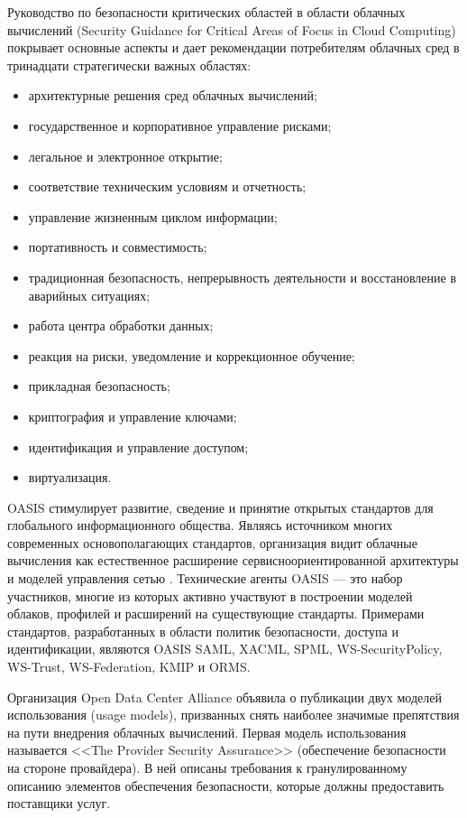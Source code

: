 Руководство по безопасности критических областей в области облачных вычислений (Security Guidance for Critical Areas of Focus in Cloud Computing) покрывает основные аспекты и дает рекомендации потребителям облачных сред в тринадцати стратегически важных областях:
\begin{itemize}
  \item архитектурные решения сред облачных вычислений;
  \item государственное и корпоративное управление рисками;
  \item легальное и электронное открытие;
  \item соответствие техническим условиям и отчетность;
  \item управление жизненным циклом информации;
  \item портативность и совместимость;
  \item традиционная безопасность, непрерывность деятельности и восстановление в аварийных ситуациях;
  \item работа центра обработки данных;
  \item реакция на риски, уведомление и коррекционное обучение;
  \item прикладная безопасность;
  \item криптография и управление ключами;
  \item идентификация и управление доступом;
  \item виртуализация.
\end{itemize}

OASIS стимулирует развитие, сведение и принятие открытых стандартов для глобального информационного общества. Являясь источником многих современных основополагающих стандартов, организация видит облачные вычисления как естественное расширение сервисноориентированной архитектуры и моделей управления сетью \cite{psta}.
Технические агенты OASIS –– это набор участников, многие из которых активно участвуют в построении моделей облаков, профилей и расширений на существующие стандарты.
Примерами стандартов, разработанных в области политик безопасности, доступа и идентификации, являются OASIS SAML, XACML, SPML, WS-SecurityPolicy, WS-Trust, WS-Federation, KMIP и ORMS.

Организация Open Data Center Alliance объявила о публикации двух моделей использования (usage models), призванных снять наиболее значимые препятствия на пути внедрения облачных вычислений.
Первая модель использования называется <<The Provider Security Assurance>> (обеспечение безопасности на стороне провайдера).
В ней описаны требования к гранулированному описанию элементов обеспечения безопасности, которые должны предоставить поставщики услуг.

